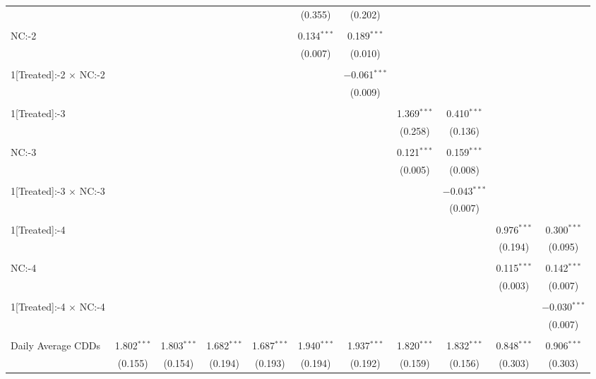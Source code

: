 \begin{table}[!htbp]
\begin{tabular}{@{\extracolsep{5pt}}lcccccccccc}
  &  &  &  &  & (0.355) & (0.202) &  &  &  &  \\ 
  & & & & & & & & & & \\ 
 NC:-2 &  &  &  &  & 0.134$^{***}$ & 0.189$^{***}$ &  &  &  &  \\ 
  &  &  &  &  & (0.007) & (0.010) &  &  &  &  \\ 
  & & & & & & & & & & \\ 
 1[Treated]:-2 $\times$ NC:-2 &  &  &  &  &  & $-$0.061$^{***}$ &  &  &  &  \\ 
  &  &  &  &  &  & (0.009) &  &  &  &  \\ 
  & & & & & & & & & & \\ 
 1[Treated]:-3 &  &  &  &  &  &  & 1.369$^{***}$ & 0.410$^{***}$ &  &  \\ 
  &  &  &  &  &  &  & (0.258) & (0.136) &  &  \\ 
  & & & & & & & & & & \\ 
 NC:-3 &  &  &  &  &  &  & 0.121$^{***}$ & 0.159$^{***}$ &  &  \\ 
  &  &  &  &  &  &  & (0.005) & (0.008) &  &  \\ 
  & & & & & & & & & & \\ 
 1[Treated]:-3 $\times$ NC:-3 &  &  &  &  &  &  &  & $-$0.043$^{***}$ &  &  \\ 
  &  &  &  &  &  &  &  & (0.007) &  &  \\ 
  & & & & & & & & & & \\ 
 1[Treated]:-4 &  &  &  &  &  &  &  &  & 0.976$^{***}$ & 0.300$^{***}$ \\ 
  &  &  &  &  &  &  &  &  & (0.194) & (0.095) \\ 
  & & & & & & & & & & \\ 
 NC:-4 &  &  &  &  &  &  &  &  & 0.115$^{***}$ & 0.142$^{***}$ \\ 
  &  &  &  &  &  &  &  &  & (0.003) & (0.007) \\ 
  & & & & & & & & & & \\ 
 1[Treated]:-4 $\times$ NC:-4 &  &  &  &  &  &  &  &  &  & $-$0.030$^{***}$ \\ 
  &  &  &  &  &  &  &  &  &  & (0.007) \\ 
  & & & & & & & & & & \\ 
 Daily Average CDDs & 1.802$^{***}$ & 1.803$^{***}$ & 1.682$^{***}$ & 1.687$^{***}$ & 1.940$^{***}$ & 1.937$^{***}$ & 1.820$^{***}$ & 1.832$^{***}$ & 0.848$^{***}$ & 0.906$^{***}$ \\ 
  & (0.155) & (0.154) & (0.194) & (0.193) & (0.194) & (0.192) & (0.159) & (0.156) & (0.303) & (0.303) \\ 

\end{tabular}
\end{table}
